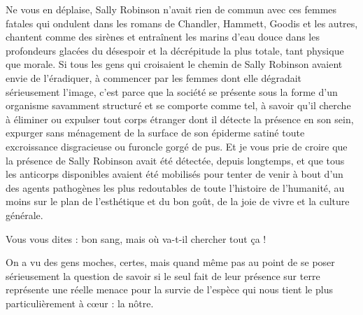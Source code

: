 Ne vous en déplaise, Sally Robinson n’avait rien de commun avec ces femmes fatales qui ondulent dans les romans de Chandler, Hammett, Goodis et les autres, chantent comme des sirènes et entraînent les marins d’eau douce dans les profondeurs glacées du désespoir et la décrépitude la plus totale, tant physique que morale. Si tous les gens qui croisaient le chemin de Sally Robinson avaient envie de l’éradiquer, à commencer par les femmes dont elle dégradait sérieusement l’image, c’est parce que la société se présente sous la forme d’un organisme savamment structuré et se comporte comme tel, à savoir qu’il cherche à éliminer ou expulser tout corps étranger dont il détecte la présence en son sein, expurger sans ménagement de la surface de son épiderme satiné toute excroissance disgracieuse ou furoncle gorgé de pus. Et je vous prie de croire que la présence de Sally Robinson avait été détectée, depuis longtemps, et que tous les anticorps disponibles avaient été mobilisés pour tenter de venir à bout d’un des agents pathogènes les plus redoutables de toute l’histoire de l’humanité, au moins sur le plan de l’esthétique et du bon goût, de la joie de vivre et la culture générale.

Vous vous dites : bon sang, mais où va-t-il chercher tout ça !

On a vu des gens moches, certes, mais quand même pas au point de se poser sérieusement la question de savoir si le seul fait de leur présence sur terre représente une réelle menace pour la survie de l’espèce qui nous tient le plus particulièrement à cœur : la nôtre.

